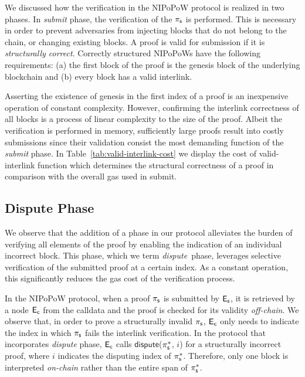 We discussed how the verification in the NIPoPoW protocol is realized in two
phases. In \emph{submit} phase, the verification of the $\mathsf{\pi_{s}}$ is performed.
This is necessary in order to prevent adversaries from injecting blocks that do
not belong to the chain, or changing existing blocks. A proof is valid for
submission if it is \emph{structurally correct}. Correctly structured NIPoPoWs
have the following requirements: (a) the first block of the proof is the
genesis block of the underlying blockchain and (b) every block has a valid
interlink.

Asserting the existence of genesis in the first index of a proof is an
inexpensive operation of constant complexity. However, confirming the interlink
correctness of all blocks is a process of linear complexity to the size of the
proof. Albeit the verification is performed in memory, sufficiently large
proofs result into costly submissions since their validation consist the most
demanding function of the \emph{submit} phase. In
Table~\ref{tab:valid-interlink-cost} we display the cost of
\textsf{valid-interlink} function which determines the structural correctness
of a proof in comparison with the overall gas used in \textsf{submit}.



\newcommand{\dispute}{\emph{dispute\ }}

\subsection{Dispute Phase} We observe that the addition of a phase in
our protocol alleviates the burden of verifying all elements of the proof by
enabling the indication of an individual incorrect block. This phase, which we
term \dispute phase, leverages selective verification of the submitted proof at
a certain index. As a constant operation, this significantly reduces the gas
cost of the verification process.

In the NIPoPoW protocol, when a proof $\mathsf{\pi_{s}}$ is submitted by $\mathsf{E_{s}}$, it is
retrieved by a node $\mathsf{E_{c}}$ from the calldata and the proof is checked for its
validity \emph{off-chain}. We observe that, in
order to prove a structurally invalid $\mathsf{\pi_{s}}$, $\mathsf{E_{c}}$ only needs to
indicate the index in which $\mathsf{\pi_{s}}$ fails the interlink verification. In the
protocol that incorporates \emph{dispute} phase, $\mathsf{E_{c}}$ calls
$\textsf{dispute}$($\mathsf{\pi_{s}^*}$, $i$) for a structurally incorrect proof, where $i$
indicates the disputing index of $\mathsf{\pi_{s}^*}$. Therefore, only one block is
interpreted \emph{on-chain} rather than the entire span of $\mathsf{\pi_{s}^*}$.

